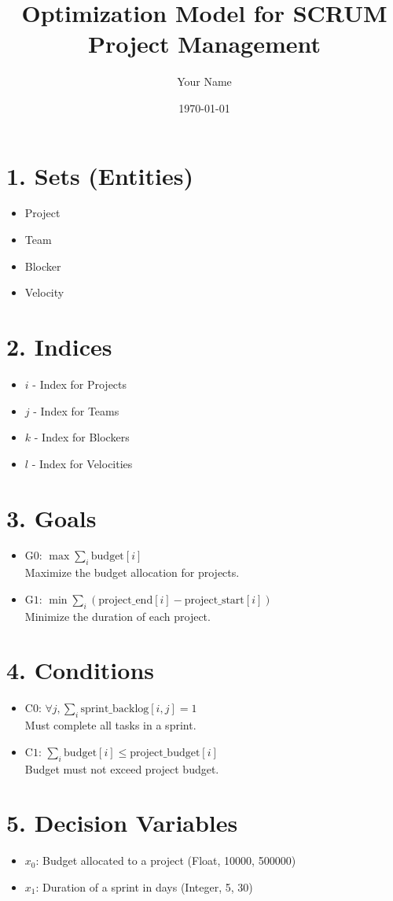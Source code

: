 \documentclass{article}
\title{Optimization Model for SCRUM Project Management}
\author{Your Name}
\date{\today}
\begin{document}
\maketitle

\tableofcontents

\section{1. Sets (Entities)}
\begin{itemize}
    \item Project
    \item Team
    \item Blocker
    \item Velocity
\end{itemize}

\section{2. Indices}
\begin{itemize}
    \item $i$ - Index for Projects
    \item $j$ - Index for Teams
    \item $k$ - Index for Blockers
    \item $l$ - Index for Velocities
\end{itemize}

\section{3. Goals}
\begin{itemize}
    \item $\text{G0: } \max \sum_{i} \text{budget}[i]$ \\
      Maximize the budget allocation for projects.
      
    \item $\text{G1: } \min \sum_{i} (\text{project\_end}[i] - \text{project\_start}[i])$ \\
      Minimize the duration of each project.
\end{itemize}

\section{4. Conditions}
\begin{itemize}
    \item $\text{C0: } \forall j, \sum_{i} \text{sprint\_backlog}[i,j] = 1$ \\
      Must complete all tasks in a sprint.
      
    \item $\text{C1: } \sum_{i} \text{budget}[i] \leq \text{project\_budget}[i]$ \\
      Budget must not exceed project budget.
\end{itemize}

\section{5. Decision Variables}
\begin{itemize}
    \item $x_0$: Budget allocated to a project (Float, {10000, 500000})
    
    \item $x_1$: Duration of a sprint in days (Integer, {5, 30})
\end{itemize}
\end{document}

